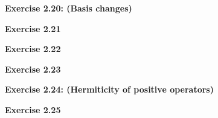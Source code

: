 \documentclass{article}
\begin{document}
\bigskip

\begin{framed}
    \noindent \textbf{Exercise 2.20: (Basis changes)}
    
    \medskip
    
    
\end{framed}

\bigskip

\begin{framed}
    \noindent \textbf{Exercise 2.21}
    
    \medskip
    
    
\end{framed}

\bigskip

\begin{framed}
    \noindent \textbf{Exercise 2.22}
    
    \medskip
    
    
\end{framed}

\bigskip

\begin{framed}
    \noindent \textbf{Exercise 2.23}
    
    \medskip
    
    
\end{framed}

\bigskip

\begin{framed}
    \noindent \textbf{Exercise 2.24: (Hermiticity of positive operators)}
    
    \medskip
    
    
\end{framed}

\bigskip

\begin{framed}
    \noindent \textbf{Exercise 2.25}
    
    \medskip
    
    
\end{framed}

\bigskip
\end{document}
